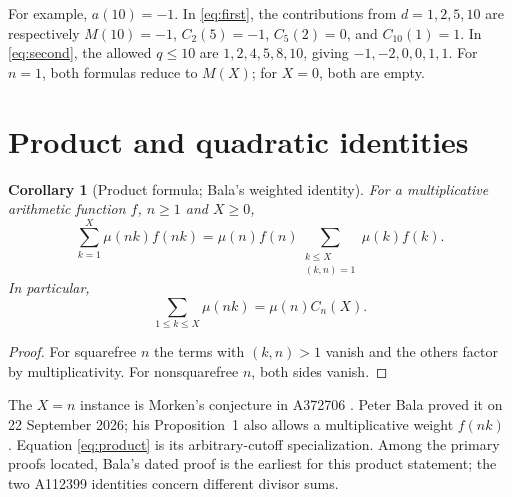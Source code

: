 \documentclass[11pt]{article}
\newtheorem{corollary}[theorem]{Corollary}
\newcommand{\mob}{\mu}
\newcommand{\C}{C}
\begin{document}
For example, $a(10)=-1$. In \eqref{eq:first}, the contributions from
$d=1,2,5,10$ are respectively $M(10)=-1$, $\C_2(5)=-1$,
$\C_5(2)=0$, and $\C_{10}(1)=1$. In \eqref{eq:second}, the allowed
$q\leq10$ are $1,2,4,5,8,10$, giving $-1,-2,0,0,1,1$.
For $n=1$, both formulas reduce to $M(X)$; for $X=0$, both are empty.

\section{Product and quadratic identities}
\begin{corollary}[Product formula; Bala's weighted identity]\label{cor:product}
For a multiplicative arithmetic function $f$, $n\geq1$ and $X\geq0$,
\[
 \sum_{k=1}^{X}\mob(nk)f(nk)
 =\mob(n)f(n)\sum_{\substack{k\leq X\\(k,n)=1}}\mob(k)f(k).
\]
In particular,
\begin{equation}\label{eq:product}
 \sum_{1\leq k\leq X}\mob(nk)=\mob(n)\C_n(X).
\end{equation}
\end{corollary}
\begin{proof}
For squarefree $n$ the terms with $(k,n)>1$ vanish and the others
factor by multiplicativity. For nonsquarefree $n$, both sides vanish.
\end{proof}
The $X=n$ instance is Morken's conjecture in A372706 \cite{a372706}.
Peter Bala proved it on 22 September 2026; his Proposition~1 also allows
a multiplicative weight $f(nk)$ \cite{bala}. Equation \eqref{eq:product}
is its arbitrary-cutoff specialization. Among the primary proofs located,
Bala's dated proof is the earliest for this product statement; the two
A112399 identities concern different divisor sums.
\end{document}
